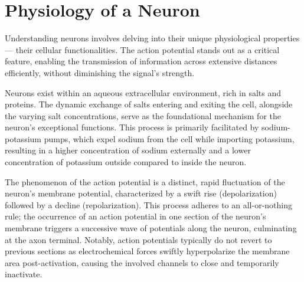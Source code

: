 \documentclass[12pt,a4paper]{report}
\begin{document}
\section{Physiology of a Neuron}

Understanding neurons involves delving into their unique physiological properties — their cellular functionalities. The action potential stands out as a critical feature, enabling the transmission of information across extensive distances efficiently, without diminishing the signal's strength.

Neurons exist within an aqueous extracellular environment, rich in salts and proteins. The dynamic exchange of salts entering and exiting the cell, alongside the varying salt concentrations, serve as the foundational mechanism for the neuron's exceptional functions. This process is primarily facilitated by sodium-potassium pumps, which expel sodium from the cell while importing potassium, resulting in a higher concentration of sodium externally and a lower concentration of potassium outside compared to inside the neuron.

The phenomenon of the action potential is a distinct, rapid fluctuation of the neuron's membrane potential, characterized by a swift rise (depolarization) followed by a decline (repolarization). This process adheres to an all-or-nothing rule; the occurrence of an action potential in one section of the neuron's membrane triggers a successive wave of potentials along the neuron, culminating at the axon terminal. Notably, action potentials typically do not revert to previous sections as electrochemical forces swiftly hyperpolarize the membrane area post-activation, causing the involved channels to close and temporarily inactivate.
\end{document}
